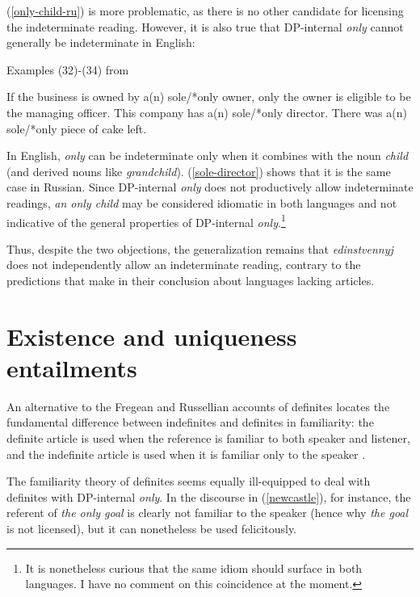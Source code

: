 \documentclass{article}
\begin{document}
(\ref{only-child-ru}) is more problematic, as there is no other candidate for licensing the indeterminate reading. However, it is also true that DP-internal \textit{only} cannot generally be indeterminate in English:


\begin{exe}
	\ex Examples (32)-(34) from \citet{cb2012a} \begin{xlist}
		\ex If the business is owned by a(n) sole/*only owner, only the owner is eligible to be the managing officer.
		\ex This company has a(n) sole/*only director.
		\ex There was a(n) sole/*only piece of cake left.
	\end{xlist}
\end{exe}

In English, \textit{only} can be indeterminate only when it combines with the noun \textit{child} (and derived nouns like \textit{grandchild}). (\ref{sole-director}) shows that it is the same case in Russian. Since DP-internal \textit{only} does not productively allow indeterminate readings, \textit{an only child} may be considered idiomatic in both languages and not indicative of the general properties of DP-internal \textit{only}.\footnote{It is nonetheless curious that the same idiom should surface in both languages. I have no comment on this coincidence at the moment.}

Thus, despite the two objections, the generalization remains that \textit{edinstvennyj} does not independently allow an indeterminate reading, contrary to the predictions that \citet{cb2015} make in their conclusion about languages lacking articles.


\section{Existence and uniqueness entailments \label{sec:exist-unique}}

An alternative to the Fregean and Russellian accounts of definites locates the fundamental difference between indefinites and definites in familiarity: the definite article is used when the reference is familiar to both speaker and listener, and the indefinite article is used when it is familiar only to the speaker \citep{heim82}.

The familiarity theory of definites seems equally ill-equipped to deal with definites with DP-internal \textit{only}. In the discourse in (\ref{newcastle}), for instance, the referent of \textit{the only goal} is clearly not familiar to the speaker (hence why \textit{the goal} is not licensed), but it can nonetheless be used felicitously.
\end{document}

